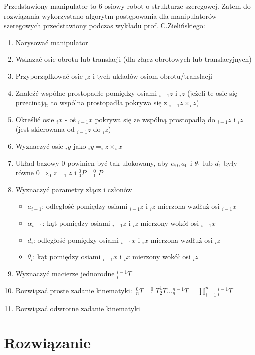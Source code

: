 \documentclass{article}
\begin{document}
Przedstawiony manipulator to 6-osiowy robot o strukturze szeregowej. Zatem do rozwiązania wykorzystano algorytm postępowania dla manipulatorów szeregowych przedstawiony podczas wykładu prof. C.Zielińskiego:
\begin{enumerate}
\item Narysować manipulator
\item Wskazać osie obrotu lub translacji (dla złącz obrotowych lub translacyjnych)
\item Przyporządkować osie $_i z$ i-tych układów osiom obrotu/translacji
\item Znaleźć wspólne prostopadłe pomiędzy osiami $_{i-1} z$ i $_i z$ (jeżeli te osie się przecinają, to wspólna prostopadła pokrywa się z $_{i-1} z \times _i z $)
\item Okre\'slić osie $_i x$ - o\'s $_{i-1}x$ pokrywa się ze wspólną prostopadłą do $_{i-1} z$ i $_i z$ (jest skierowana od $_{i-1} z$ do $_i z$)
\item Wyznaczyć osie $_{i}y$ jako $_{i}y = _{i}z \times _{i}x$
\item Układ bazowy 0 powinien być tak ulokowany, aby $\alpha_0, a_0$ i $\theta_1$ lub $d_1$ były równe $0 \Rightarrow _{0}z = _{1}z$ i $_0^0 P = _1^0 P$ 
\item Wyznaczyć parametry złącz i członów 
\begin{itemize}
\item $a_{i-1}$: odległo\'sć pomiędzy osiami $_{i-1}z$ i $_{i}z$ mierzona wzdłuż osi $_{i-1}x$
\item $\alpha_{i-1}$: kąt pomiędzy osiami $_{i-1}z$ i $_{i}z$ mierzony wokół osi $_{i-1}x$
\item $d_i$: odległo\'sć pomiędzy osiami $_{i-1}x$ i $_{i}x$ mierzona wzdłuż osi $_{i}z$
\item $\theta_i$: kąt pomiędzy osiami $_{i-1}x$ i $_{i}x$ mierzony wokół osi $_{i}z$
\end{itemize}
\item Wyznaczyć macierze jednorodne $^{i-1}_{i}T$
\item Rozwiązać proste zadanie kinematyki: $~_n^0 T = _1^0 T _2^1 T \ldots _n^{n-1}T= \prod\limits_{i=1}^n  {_i^{i-1}T}$
\item Rozwiązać odwrotne zadanie kinematyki
\end{enumerate}


\section{Rozwiązanie}
\end{document}
